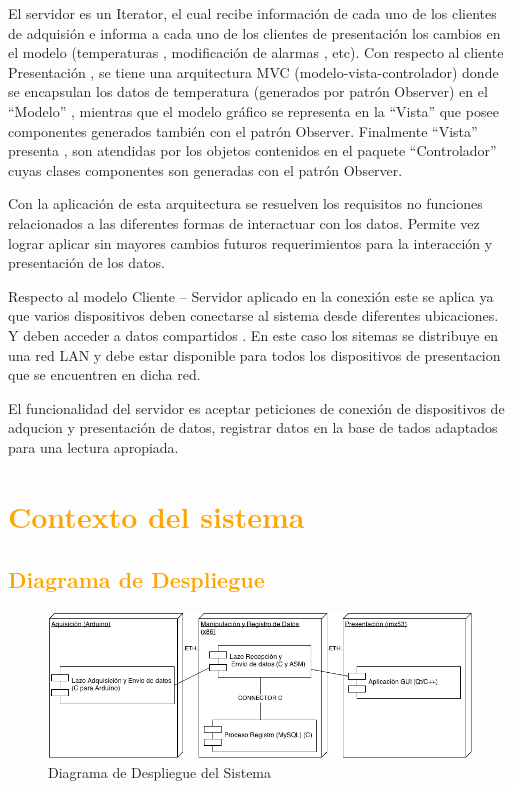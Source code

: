 El servidor es un Iterator, el cual recibe información de cada uno de los
clientes de adquisión e informa a cada uno de los clientes de presentación los
cambios en el modelo (temperaturas , modificación de alarmas , etc).
Con respecto al cliente Presentación , se tiene una arquitectura MVC
(modelo-vista-controlador) donde se encapsulan los datos  de
temperatura (generados por patrón Observer) en el “Modelo” , mientras que el
modelo gráfico se representa en la “Vista” que posee componentes generados
también con el patrón Observer. Finalmente “Vista” presenta , son atendidas por
los objetos contenidos en el paquete “Controlador” cuyas clases componentes son
generadas con el patrón Observer.

Con la aplicación de esta arquitectura se resuelven los requisitos no funciones
relacionados a las diferentes formas de interactuar con los datos.
Permite vez lograr aplicar sin mayores cambios futuros requerimientos para la
interacción y presentación de los datos.

Respecto al modelo Cliente – Servidor aplicado en la conexión este se
aplica ya que varios dispositivos deben conectarse al sistema  desde diferentes
ubicaciones. Y deben acceder a datos compartidos . En este caso los sitemas se
distribuye en una red LAN y debe estar disponible para todos los dispositivos de
presentacion que se encuentren en dicha red.

El funcionalidad del servidor es aceptar peticiones de conexión de dispositivos
de adqucion y presentación de datos, registrar datos en la base de tados
adaptados para una lectura apropiada.

\newpage
\section{\textcolor{orange}{Contexto del sistema}}
\subsection{\textcolor{orange}{Diagrama de Despliegue}}
\begin{figure}[h!]
 \begin{center}
  \includegraphics[width=1\textwidth,keepaspectratio=true]{img/Deployement.png}
  \caption{Diagrama de Despliegue del Sistema}
  \label{fig:esquema}
 \end{center}
\end{figure}

